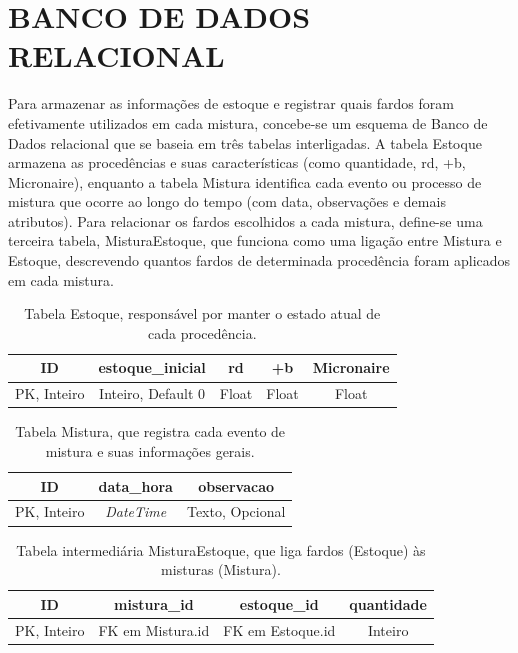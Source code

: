 \documentclass[
    12pt,                %
    openright,           %
    oneside,             %
    a4paper,             %
    english,             %
    spanish,             %
    brazil               %
]{ufscar}
\begin{document}
\section{BANCO DE DADOS RELACIONAL}

Para armazenar as informações de estoque e registrar quais fardos foram efetivamente utilizados em cada mistura, concebe-se um esquema de Banco de Dados relacional que se baseia em três tabelas interligadas. A tabela Estoque armazena as procedências e suas características (como quantidade, rd, +b, Micronaire), enquanto a tabela Mistura identifica cada evento ou processo de mistura que ocorre ao longo do tempo (com data, observações e demais atributos). Para relacionar os fardos escolhidos a cada mistura, define-se uma terceira tabela, MisturaEstoque, que funciona como uma ligação entre Mistura e Estoque, descrevendo quantos fardos de determinada procedência foram aplicados em cada mistura.

\begin{table}[htp]
    \centering
    \caption{Tabela Estoque, responsável por manter o estado atual de cada procedência.}
    \begin{tabular}{c c c c c}
         ID & estoque\_inicial & rd & +b & Micronaire \\ \hline
         PK, Inteiro & Inteiro, Default 0 & Float & Float & Float \\
    \end{tabular}
    \label{tab:tb_estoque}
\end{table}

\begin{table}[htp]
    \centering
    \caption{Tabela Mistura, que registra cada evento de mistura e suas informações gerais.}
    \begin{tabular}{c c c}
         ID & data\_hora & observacao \\ \hline
         PK, Inteiro & \textit{DateTime} & Texto, Opcional \\
    \end{tabular}
    \label{tab:tb_mistura}
\end{table}

\begin{table}[htp]
    \centering
    \caption{Tabela intermediária MisturaEstoque, que liga fardos (Estoque) às misturas (Mistura).}
    \begin{tabular}{c c c c}
         ID & mistura\_id & estoque\_id & quantidade \\ \hline
         PK, Inteiro & FK em Mistura.id & FK em Estoque.id & Inteiro \\
    \end{tabular}
    \label{tab:tb_mistura_estoque}
\end{table}
\end{document}
